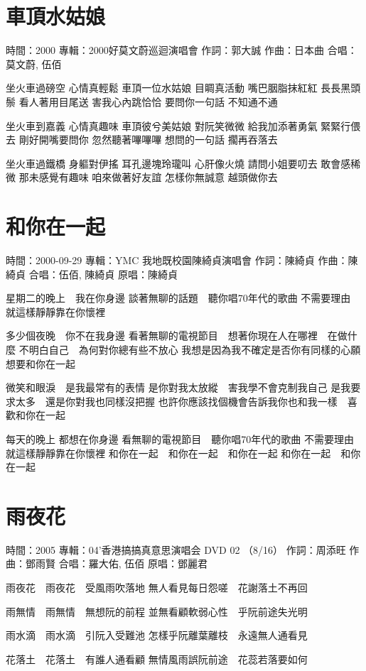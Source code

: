 \documentclass[UTF8,a4paper,oneside,twocolumn,12pt]{ctexbook}
\newcommand{\infopair}[2]{\textbullet #1：#2}
\newcommand{\zc}[1][伍佰]{\infopair{作詞}{#1}}
\newcommand{\zq}[1][伍佰]{\infopair{作曲}{#1}}
\newcommand{\zj}[1]{\infopair{專輯}{#1}}
\newcommand{\yc}[1]{\infopair{原唱}{#1}}
\newcommand{\sj}[1]{\infopair{時間}{#1}}
\newenvironment{info}{\begin{flushleft}\kaishu
	}
	{\end{flushleft}\normalsize\yahei\par}
\newenvironment{lyric}{
	}
{}
\begin{document}
\section{車頂水姑娘}
\begin{info}
	\sj{2000}
	\zj{2000好莫文蔚巡迴演唱會}
	\zc[郭大誠]
	\zq[日本曲]
	\infopair{合唱}{莫文蔚, 伍佰}
\end{info}
\begin{lyric}
	坐火車過磅空 心情真輕鬆 車頂一位水姑娘 目睭真活動
	嘴巴胭脂抹紅紅 長長黑頭鬃 看人著用目尾送 害我心內跳恰恰
	要問你一句話 不知通不通

	坐火車到嘉義 心情真趣味 車頂彼兮美姑娘 對阮笑微微
	給我加添著勇氣 緊緊行偎去 剛好開嘴要問你 忽然聽著嗶嗶嗶
	想問的一句話 擱再吞落去

	坐火車過鐵橋 身軀對伊搖 耳孔邊塊玲瓏叫 心肝像火燒
	請問小姐要叨去 敢會感稀微 那未感覺有趣味 咱來做著好友誼
	怎樣你無誠意 越頭做你去
\end{lyric}

\section{和你在一起}
\begin{info}
	\sj{2000-09-29}
	\zj{YMC 我地既校園陳綺貞演唱會}
	\zc[陳綺貞]
	\zq[陳綺貞]
	\infopair{合唱}{伍佰, 陳綺貞}
	\yc{陳綺貞}
\end{info}
\begin{lyric}
	星期二的晚上　我在你身邊
	談著無聊的話題　聽你唱70年代的歌曲
	不需要理由　就這樣靜靜靠在你懷裡

	多少個夜晚　你不在我身邊
	看著無聊的電視節目　想著你現在人在哪裡　在做什麼
	不明白自己　為何對你總有些不放心
	我想是因為我不確定是否你有同樣的心願　想要和你在一起

	微笑和眼淚　是我最常有的表情
	是你對我太放縱　害我學不會克制我自己
	是我要求太多　還是你對我也同樣沒把握
	也許你應該找個機會告訴我你也和我一樣　喜歡和你在一起

	每天的晚上  都想在你身邊
	看無聊的電視節目　聽你唱70年代的歌曲
	不需要理由　就這樣靜靜靠在你懷裡
	和你在一起　和你在一起　和你在一起
	和你在一起　和你在一起
\end{lyric}

\section{雨夜花}
\begin{info}
	\sj{2005}
	\zj{04'香港搞搞真意思演唱会 DVD 02 （8/16）}
	\zc[周添旺]
	\zq[鄧雨賢]
	\infopair{合唱}{羅大佑, 伍佰}
	\yc{鄧麗君}
\end{info}
\begin{lyric}
	雨夜花　雨夜花　受風雨吹落地
	無人看見每日怨嗟　花謝落土不再回

	雨無情　雨無情　無想阮的前程
	並無看顧軟弱心性　乎阮前途失光明

	雨水滴　雨水滴　引阮入受難池
	怎樣乎阮離葉離枝　永遠無人通看見

	花落土　花落土　有誰人通看顧
	無情風雨誤阮前途　花蕊若落要如何
\end{lyric}
\end{document}
